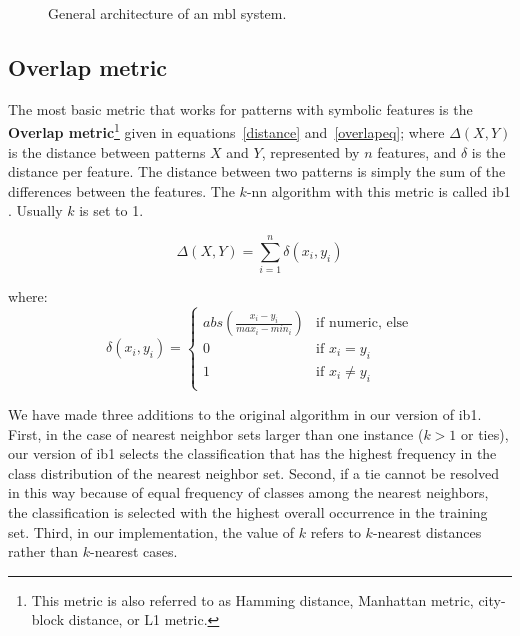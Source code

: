 \documentclass{report}
\begin{document}
\begin{figure}[htb]
        \begin{center}
                \leavevmode
                \epsfxsize=8cm
                \caption{General architecture of an {\sc mbl} system.
                }
                \label{mbl-method}
        \end{center}
\end{figure}

\subsection{Overlap metric}
\label{overlap}

The most basic metric that works for patterns with symbolic features
is the {\bf Overlap metric}\footnote{This metric is also referred to
as Hamming distance, Manhattan metric, city-block distance, or L1
metric.} given in equations~\ref{distance} and~\ref{overlapeq}; where
$\Delta(X,Y)$ is the distance between patterns $X$ and $Y$,
represented by $n$ features, and $\delta$ is the distance per
feature. The distance between two patterns is simply the sum of the
differences between the features. The $k$-{\sc nn} algorithm with this
metric is called {\sc ib1} \cite{Aha+91}. Usually $k$ is set to 1.

\begin{equation}
\Delta(X,Y) = \sum_{i=1}^{n} \delta(x_{i},y_{i})
\label{distance}
\end{equation}

where:
\begin{equation}
\delta(x_{i}, y_{i}) = \left\{ \begin{array}{ll}
		abs(\frac{x_{i}-y_{i}}{max_{i}-min_{i}}) & \mbox{if numeric, else}\\
		0 & \mbox{if $x_{i} = y_{i}$}\\
		1 & \mbox{if $x_{i} \neq y_{i}$}\\
	\end{array} \right.
\label{overlapeq}
\end{equation}

We have made three additions to the original algorithm \cite{Aha+91} in
our version of {\sc ib1}.  First, in the case of nearest neighbor sets
larger than one instance ($k>1$ or ties), our version of {\sc ib1}
selects the classification that has the highest frequency in the class
distribution of the nearest neighbor set. Second, if a tie cannot be
resolved in this way because of equal frequency of classes among the
nearest neighbors, the classification is selected with the highest
overall occurrence in the training set. Third, in our implementation,
the value of $k$ refers to $k$-nearest distances rather than
$k$-nearest cases.
\end{document}
